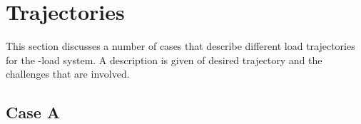 
\newcommand{\caseA}{71}
\newcommand{\caseB}{72}
\newcommand{\caseC}{74}
\newpage
\section{Trajectories}\label{sec:exp.traj}


This section discusses a number of cases that describe different load trajectories for the -load system.
A description is given of desired trajectory and the challenges that are involved.

\subsection*{Case A}




